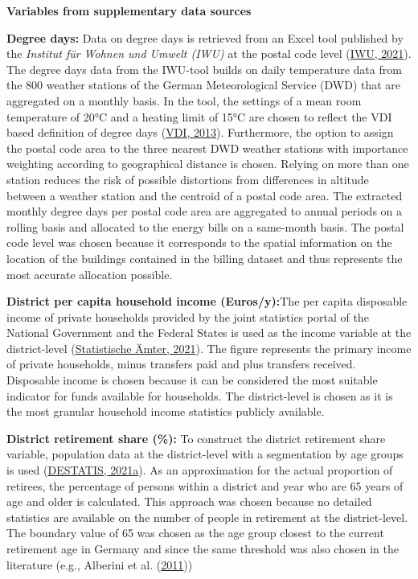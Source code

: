 \documentclass[12pt,twoside]{reedthesis}
\begin{document}
\textbf{Variables from supplementary data sources}

\textbf{Degree days:} Data on degree days is retrieved from an Excel tool published by the \emph{Institut für Wohnen und Umwelt (IWU)} at the postal code level (\protect\hyperlink{ref-iwu21}{IWU, 2021}). The degree days data from the IWU-tool builds on daily temperature data from the 800 weather stations of the German Meteorological Service (DWD) that are aggregated on a monthly basis. In the tool, the settings of a mean room temperature of 20°C and a heating limit of 15°C are chosen to reflect the VDI based definition of degree days (\protect\hyperlink{ref-vdi13}{VDI, 2013}). Furthermore, the option to assign the postal code area to the three nearest DWD weather stations with importance weighting according to geographical distance is chosen. Relying on more than one station reduces the risk of possible distortions from differences in altitude between a weather station and the centroid of a postal code area. The extracted monthly degree days per postal code area are aggregated to annual periods on a rolling basis and allocated to the energy bills on a same-month basis. The postal code level was chosen because it corresponds to the spatial information on the location of the buildings contained in the billing dataset and thus represents the most accurate allocation possible.

\textbf{District per capita household income (Euros/y):}The per capita disposable income of private households provided by the joint statistics portal of the National Government and the Federal States is used as the income variable at the district-level (\protect\hyperlink{ref-statistischeamter21}{Statistische Ämter, 2021}). The figure represents the primary income of private households, minus transfers paid and plus transfers received. Disposable income is chosen because it can be considered the most suitable indicator for funds available for households. The district-level is chosen as it is the most granular household income statistics publicly available.

\textbf{District retirement share (\%):} To construct the district retirement share variable, population data at the district-level with a segmentation by age groups is used (\protect\hyperlink{ref-destatis21c}{DESTATIS, 2021a}). As an approximation for the actual proportion of retirees, the percentage of persons within a district and year who are 65 years of age and older is calculated. This approach was chosen because no detailed statistics are available on the number of people in retirement at the district-level. The boundary value of 65 was chosen as the age group closest to the current retirement age in Germany and since the same threshold was also chosen in the literature (e.g., Alberini et al. (\protect\hyperlink{ref-alberini_etal11}{2011}))
\end{document}
